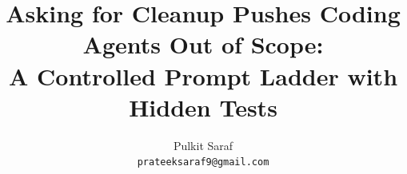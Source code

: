 \documentclass[11pt]{article}
\title{Asking for Cleanup Pushes Coding Agents Out of Scope:\\A Controlled Prompt Ladder with Hidden Tests}
\author{
  Pulkit Saraf\\
  \texttt{prateeksaraf9@gmail.com}
}
\date{}
\begin{document}
\maketitle

\begin{abstract}

\end{abstract}














\appendix

\end{document}
